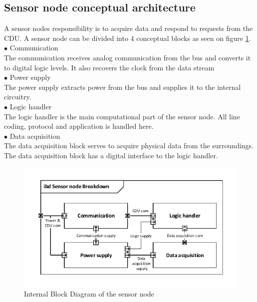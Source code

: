 \subsection{Sensor node conceptual architecture}
A sensor nodes responsibility is to acquire data and respond to requests from the CDU. A sensor node can be divided into 4 conceptual blocks as seen on figure \ref{fig:SN_IBD}. \\
\hspace*{.6cm}$\bullet$ Communication\\
The communication receives analog communication from the bus and converts it to digital logic levels. It also recovers the clock from the data stream\\
\hspace*{.6cm}$\bullet$ Power supply\\
The power supply extracts power from the bus and supplies it to the internal circuitry.\\
\hspace*{.6cm}$\bullet$ Logic handler\\
The logic handler is the main computational part of the sensor node. All line coding, protocol and application is handled here.\\
\hspace*{.6cm}$\bullet$ Data acquisition\\
The data acquisition block serves to acquire physical data from the surroundings. The data acquisition block has a digital interface to the logic handler.\\
\begin{figure}[H]
\centering
\includegraphics[width=.8\textwidth]{billeder/11ProjectDescription/Sensor_IBD}
\caption{Internal Block Diagram of the sensor node}
\label{fig:SN_IBD}
\end{figure}

